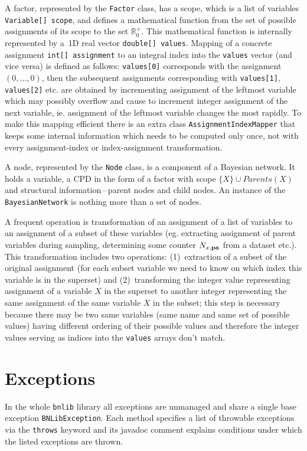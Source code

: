 \documentclass[english,cover]{fitthesis} %
\newcommand{\srccode}[1]{{\tt #1}}         %
\newcommand{\vars}[1]{{\bold{#1}}}         %
\begin{document}
A factor, represented by the \srccode{Factor} class, has a scope, which is a list of variables \srccode{Variable[] scope}, and defines a mathematical function from the set of possible assignments of its scope to the set $\mathbb{R}_0^+$. This mathematical function is internally represented by a~1D real vector \srccode{double[] values}. Mapping of a concrete assignment \srccode{int[] assignment} to an integral index into the \srccode{values} vector (and vice versa) is defined as follows: \srccode{values[0]} corresponds with the assignment $(0, \dots, 0)$, then the subsequent assignments corresponding with \srccode{values[1]}, \srccode{values[2]} etc. are obtained by incrementing assignment of the leftmost variable which may possibly overflow and cause to increment integer assignment of the next variable, ie. assignment of the leftmost variable changes the most rapidly. To make this mapping efficient there is an extra class \srccode{AssignmentIndexMapper} that keeps some internal information which needs to be computed only once, not with every assignment-index or index-assignment transformation.

A node, represented by the \srccode{Node} class, is a component of a Bayesian network. It holds a variable, a CPD in the form of a factor with scope $\lbrace X \rbrace \cup Parents(X)$ and structural information\,--\,parent nodes and child nodes. An instance of the \srccode{BayesianNetwork} is nothing more than a set of nodes.

A frequent operation is transformation of an assignment of a list of variables to an assignment of a subset of these variables (eg. extracting assignment of parent variables during sampling, determining some counter $N_{x,\vars{pa}}$ from a dataset etc.). This transformation includes two operations: (1)~extraction of a subset of the original assignment (for each subset variable we need to know on which index this variable is in the superset) and (2)~transforming the integer value representing assignment of a variable $X$ in the superset to another integer representing the same assignment of the same variable $X$ in the subset; this step is necessary because there may be two same variables (same name and same set of possible values) having different ordering of their possible values and therefore the integer values serving as indices into the \srccode{values} arrays don't match. 





\section{Exceptions}
In the whole \srccode{bnlib} library all exceptions are unmanaged and share a single base exception \srccode{BNLibException}. Each method specifies a list of throwable exceptions via the \srccode{throws} keyword and its javadoc comment explains conditions under which the listed exceptions are thrown.
\end{document}
